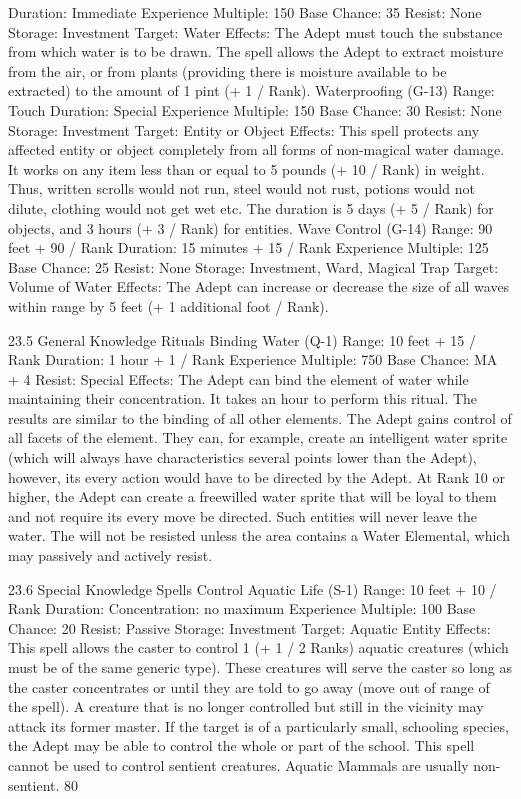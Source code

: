 \documentclass[a4paper]{article}
\begin{document}
\begin{multicols}{3}
Duration: Immediate
Experience Multiple: 150
Base Chance: 35%
Resist: None
Storage: Investment
Target: Water
Effects: The Adept must touch the substance from
which water is to be drawn. The spell allows the
Adept to extract moisture from the air, or from
plants (providing there is moisture available to be
extracted) to the amount of 1 pint (+ 1 / Rank).
Waterproofing (G-13)
Range: Touch
Duration: Special
Experience Multiple: 150
Base Chance: 30%
Resist: None
Storage: Investment
Target: Entity or Object
Effects: This spell protects any affected entity or
object completely from all forms of non-magical
water damage. It works on any item less than or
equal to 5 pounds (+ 10 / Rank) in weight. Thus,
written scrolls would not run, steel would not rust,
potions would not dilute, clothing would not get
wet etc. The duration is 5 days (+ 5 / Rank) for
objects, and 3 hours (+ 3 / Rank) for entities.
Wave Control (G-14)
Range: 90 feet + 90 / Rank
Duration: 15 minutes + 15 / Rank
Experience Multiple: 125
Base Chance: 25%
Resist: None
Storage: Investment, Ward, Magical Trap
Target: Volume of Water
Effects: The Adept can increase or decrease the
size of all waves within range by 5 feet (+ 1 additional foot / Rank).

23.5 General Knowledge Rituals
Binding Water (Q-1)
Range: 10 feet + 15 / Rank
Duration: 1 hour + 1 / Rank
Experience Multiple: 750
Base Chance: MA + 4%
Resist: Special
Effects: The Adept can bind the element of water
while maintaining their concentration. It takes an
hour to perform this ritual. The results are similar
to the binding of all other elements. The Adept
gains control of all facets of the element. They can,
for example, create an intelligent water sprite
(which will always have characteristics several
points lower than the Adept), however, its every
action would have to be directed by the Adept. At
Rank 10 or higher, the Adept can create a freewilled water sprite that will be loyal to them and
not require its every move be directed. Such entities will never leave the water. The will not be
resisted unless the area contains a Water Elemental, which may passively and actively resist.

23.6 Special Knowledge Spells
Control Aquatic Life (S-1)
Range: 10 feet + 10 / Rank
Duration: Concentration: no maximum
Experience Multiple: 100
Base Chance: 20%
Resist: Passive
Storage: Investment
Target: Aquatic Entity
Effects: This spell allows the caster to control 1 (+
1 / 2 Ranks) aquatic creatures (which must be of
the same generic type). These creatures will serve
the caster so long as the caster concentrates or until
they are told to go away (move out of range of the
spell). A creature that is no longer controlled but
still in the vicinity may attack its former master. If
the target is of a particularly small, schooling species, the Adept may be able to control the whole or
part of the school. This spell cannot be used to
control sentient creatures. Aquatic Mammals are
usually non-sentient.
80


\end{multicols}
\end{document}
